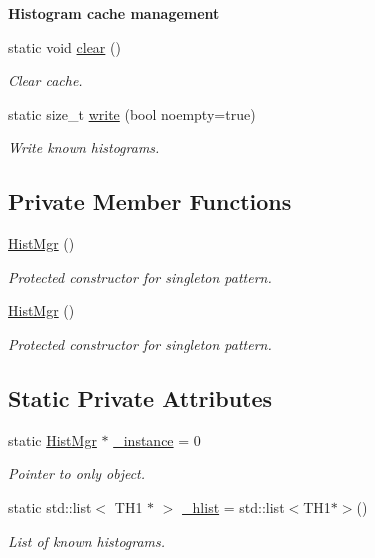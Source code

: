 \begin{Indent}{\bf Histogram cache management}
\begin{DoxyCompactItemize}
static void \hyperlink{classHistUtils_1_1HistMgr_a43c6a46f880d56f843ecf0b6d920426d}{clear} ()
\begin{DoxyCompactList}\small\item\em Clear cache. \end{DoxyCompactList}\item 
static size\+\_\+t \hyperlink{classHistUtils_1_1HistMgr_a9af371f98ca15a96b7090e6ab3785998}{write} (bool noempty=true)
\begin{DoxyCompactList}\small\item\em Write known histograms. \end{DoxyCompactList}\end{DoxyCompactItemize}
\end{Indent}
\subsection*{Private Member Functions}
\begin{DoxyCompactItemize}
\item 
\hyperlink{classHistUtils_1_1HistMgr_a1ab05ff224b8260bab8e9f2e4c9c9b12}{Hist\+Mgr} ()
\begin{DoxyCompactList}\small\item\em Protected constructor for singleton pattern. \end{DoxyCompactList}\item 
\hyperlink{classHistUtils_1_1HistMgr_a1ab05ff224b8260bab8e9f2e4c9c9b12}{Hist\+Mgr} ()
\begin{DoxyCompactList}\small\item\em Protected constructor for singleton pattern. \end{DoxyCompactList}\end{DoxyCompactItemize}
\subsection*{Static Private Attributes}
\begin{DoxyCompactItemize}
\item 
static \hyperlink{classHistUtils_1_1HistMgr}{Hist\+Mgr} $\ast$ \hyperlink{classHistUtils_1_1HistMgr_a9941e8757f5e3dabfc24422822857fe6}{\+\_\+instance} = 0
\begin{DoxyCompactList}\small\item\em Pointer to only object. \end{DoxyCompactList}\item 
static std\+::list$<$ T\+H1 $\ast$ $>$ \hyperlink{classHistUtils_1_1HistMgr_a2f35b5aff01c50080e7ea59309f69842}{\+\_\+hlist} = std\+::list$<$T\+H1$\ast$$>$()
\begin{DoxyCompactList}\small\item\em List of known histograms. \end{DoxyCompactList}\end{DoxyCompactItemize}


